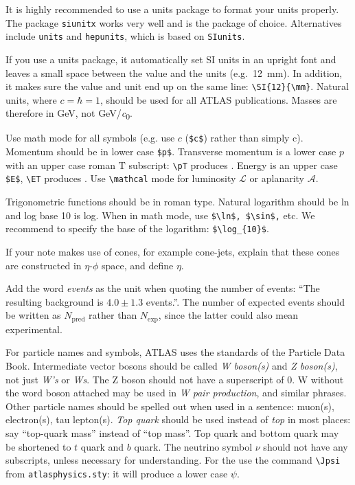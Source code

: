 \documentclass[PAPER,UKenglish,texlive=2014]{latex/atlasdoc}
\begin{document}
It is highly recommended to use a units package to format your units properly.
The package \texttt{siunitx} works very well and is the package of choice.
Alternatives include \texttt{units} and \texttt{hepunits},
which is based on \texttt{SIunits}.

If you use a units package, it automatically set SI units in an upright font
and leaves a small space between
the value and the units (e.g.\ \SI{12}{\mm}). 
In addition, it makes sure the value and unit end up on the same line: \verb|\SI{12}{\mm}|.
Natural units, where $c=\hbar=1$, should be used for all
ATLAS publications. Masses are therefore in \si{\GeV}, not \si[per-mode=symbol]{\GeV\per\clight}.

Use math mode for all symbols (e.g. use $c$ (\verb|$c$|) rather than simply c). 
Momentum should be in lower case \verb+$p$+. 
Transverse momentum is a lower case $p$ with an upper case roman $\text{T}$ subscript: 
\verb|\pT| produces \pT.
Energy is an upper case \verb+$E$+, \verb+\ET+ produces \ET.  
Use \verb|\mathcal| mode for luminosity $\mathcal{L}$ or aplanarity
$\mathcal{A}$.

Trigonometric functions should be in roman type. Natural logarithm
should be ln and log base 10 is log.  When in math mode, use
\verb+$\ln$, $\sin$,+ etc. We recommend to specify the base of the
logarithm: \verb+$\log_{10}$+.

If your note makes use of cones, for example cone-jets, explain that
these cones are constructed in $\eta$-$\phi$ space, and define $\eta$.

Add the word \emph{events} as the unit when quoting the number of
events: \enquote{The resulting background is $4.0 \pm 1.3$ events.}.  The
number of expected events should be written as $N_{\text{pred}}$ rather
than $N_{\text{exp}}$, since the latter could also mean experimental.

For particle names and symbols, ATLAS uses the standards of the
Particle Data Book. Intermediate vector bosons should be called
\emph{W boson(s)} and \emph{Z boson(s)}, not just \emph{W's} or
\emph{Ws}. The Z boson should not have a superscript of 0. W without
the word boson attached may be used in \emph{W pair production}, and
similar phrases.  Other particle names should be spelled out when used
in a sentence: muon(s), electron(s), tau lepton(s). \emph{Top quark}
should be used instead of \emph{top} in most places: 
say \enquote{top-quark mass} instead of \enquote{top mass}.
Top quark and bottom quark may be shortened to $t$ quark and $b$ quark. 
The neutrino symbol $\nu$ should not have any subscripts, unless necessary for
understanding.
For the \Jpsi{} use the command \verb+\Jpsi+ from 
\texttt{atlasphysics.sty}: it will produce a lower case $\psi$.
\end{document}
